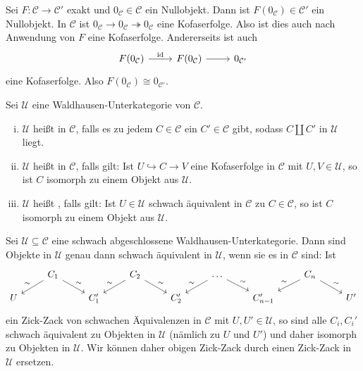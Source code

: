 \begin{bemerkung}
	Sei $F \colon \mathcal{C} \to \mathcal{C}'$ exakt und $0_{\mathcal{C}} \in \mathcal{C}$ ein Nullobjekt.
	Dann ist $F(0_{\mathcal{C}}) \in \mathcal{C}'$ ein Nullobjekt.
	In $\mathcal{C}$ ist $0_{\mathcal{C}} \to 0_{\mathcal{C}} \twoheadrightarrow 0_\mathcal{C}$ eine Kofaserfolge.
	Also ist dies auch nach Anwendung von $F$ eine Kofaserfolge.
	Andererseits ist auch
	\[
		\begin{tikzcd}
			F(0_{\mathcal{C}}) \rar["\id"] & F(0_{\mathcal{C}}) \rar & 0_{\mathcal{C}'}
		\end{tikzcd}
	\]
	eine Kofaserfolge. 
	Also $F(0_{\mathcal{C}}) \cong 0_{\mathcal{C}'}$.
\end{bemerkung}

\begin{definition}
	Sei $\mathcal{U}$ eine Waldhausen-Unterkategorie von $\mathcal{C}$.
	\begin{enumerate}[(i)]
		\item $\mathcal{U}$ heißt  in $\mathcal{C}$, falls es zu jedem $C \in \mathcal{C}$ ein $C' \in \mathcal{C}$ gibt, sodass $C \amalg C'$ in $\mathcal{U}$ liegt.
		\item $\mathcal{U}$ heißt  in $\mathcal{C}$, falls gilt: Ist $U \hookrightarrow C \to V$ eine Kofaserfolge in $\mathcal{C}$ mit $U,V \in \mathcal{U}$, so ist $C$ isomorph zu einem Objekt aus $\mathcal{U}$.
		\item $\mathcal{U}$ heißt , falls gilt: Ist $U \in \mathcal{U}$ schwach äquivalent in $\mathcal{C}$ zu $C \in \mathcal{C}$, so ist $C$ isomorph zu einem Objekt aus $\mathcal{U}$.
	\end{enumerate}
\end{definition}

\begin{bemerkung}
	Sei $\mathcal{U} \subseteq \mathcal{C}$ eine schwach abgeschlossene Waldhausen-Unterkategorie.
	Dann sind Objekte in $\mathcal{U}$ genau dann schwach äquivalent in $\mathcal{U}$, wenn sie es in $\mathcal{C}$ sind: 
	Ist 
	\[
		\begin{tikzcd}[row sep=small]
			& C_1 \dlar["\sim"'] \drar["\sim"] & & C_2 \dlar["\sim"'] \drar["\sim"] && \ldots \dlar["\sim"'] \drar["\sim"] && C_n \dlar["\sim"'] \drar["\sim"]\\
			U && C_1' && C_2'&& C_{n-1}' && U'
		\end{tikzcd}
	\]
	ein Zick-Zack von schwachen Äquivalenzen in $\mathcal{C}$ mit $U,U' \in \mathcal{U}$, so sind alle $C_i,C_i'$ schwach äquivalent zu Objekten in $\mathcal{U}$ (nämlich zu $U$ und $U'$) und daher isomorph zu Objekten in $\mathcal{U}$.
	Wir können daher obigen Zick-Zack durch einen Zick-Zack in $\mathcal{U}$ ersetzen.
\end{bemerkung}

